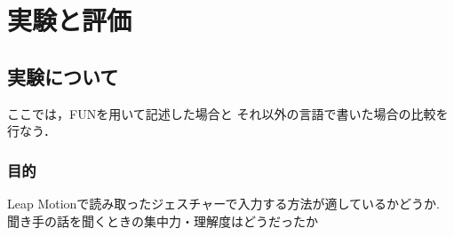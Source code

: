 \documentclass{funthesis}
\begin{document}

\chapter{実験と評価}

\section{実験について}

ここでは，FUNを用いて記述した場合と
それ以外の言語で書いた場合の比較を行なう．





\subsection{目的}
Leap Motionで読み取ったジェスチャーで入力する方法が適しているかどうか. 
聞き手の話を聞くときの集中力・理解度はどうだったか

\end{document}
